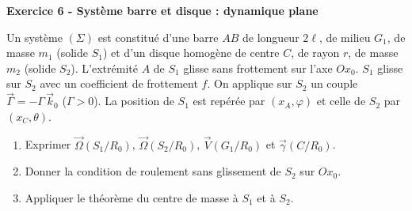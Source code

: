 \documentclass[12pt,a4paper]{article}
\begin{document}
\begin{boiteexercice}
\textbf{Exercice 6 - Système barre et disque : dynamique plane}\niveau{\difficile}

Un système $(\Sigma)$ est constitué d'une barre $AB$ de longueur $2\ell$, de milieu $G_1$, de masse $m_1$ (solide $S_1$) et d'un disque homogène de centre $C$, de rayon $r$, de masse $m_2$ (solide $S_2$). L'extrémité $A$ de $S_1$ glisse sans frottement sur l'axe $Ox_0$. $S_1$ glisse sur $S_2$ avec un coefficient de frottement $f$. On applique sur $S_2$ un couple $\vec{\Gamma} = -\Gamma\,\vec{k}_0$ ($\Gamma > 0$). La position de $S_1$ est repérée par $(x_A, \varphi)$ et celle de $S_2$ par $(x_C, \theta)$.

\begin{enumerate}
  \item Exprimer $\vec{\Omega}(S_1/R_0)$, $\vec{\Omega}(S_2/R_0)$, $\vec{V}(G_1/R_0)$ et $\vec{\gamma}(C/R_0)$.
  \item Donner la condition de roulement sans glissement de $S_2$ sur $Ox_0$.
  \item Appliquer le théorème du centre de masse à $S_1$ et à $S_2$.
\end{enumerate}
\end{boiteexercice}
\end{document}
